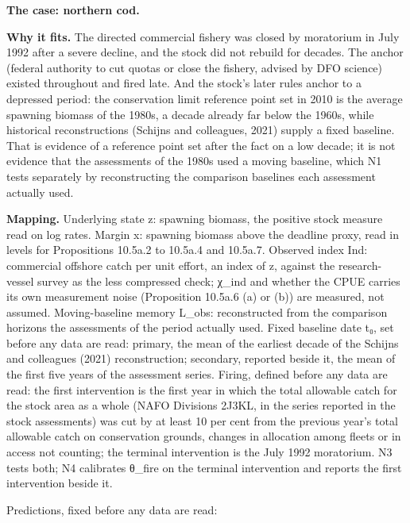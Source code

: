 \documentclass[
]{article}
\begin{document}
\textbf{The case: northern cod.}

\textbf{Why it fits.} The directed commercial fishery was closed by
moratorium in July 1992 after a severe decline, and the stock did not
rebuild for decades. The anchor (federal authority to cut quotas or
close the fishery, advised by DFO science) existed throughout and fired
late. And the stock's later rules anchor to a depressed period: the
conservation limit reference point set in 2010 is the average spawning
biomass of the 1980s, a decade already far below the 1960s, while
historical reconstructions (Schijns and colleagues, 2021) supply a fixed
baseline. That is evidence of a reference point set after the fact on a
low decade; it is not evidence that the assessments of the 1980s used a
moving baseline, which N1 tests separately by reconstructing the
comparison baselines each assessment actually used.

\textbf{Mapping.} Underlying state z: spawning biomass, the positive
stock measure read on log rates. Margin x: spawning biomass above the
deadline proxy, read in levels for Propositions 10.5a.2 to 10.5a.4 and
10.5a.7. Observed index Ind: commercial offshore catch per unit effort,
an index of z, against the research-vessel survey as the less compressed
check; χ\_ind and whether the CPUE carries its own measurement noise
(Proposition 10.5a.6 (a) or (b)) are measured, not assumed.
Moving-baseline memory L\_obs: reconstructed from the comparison
horizons the assessments of the period actually used. Fixed baseline
date t₀, set before any data are read: primary, the mean of the earliest
decade of the Schijns and colleagues (2021) reconstruction; secondary,
reported beside it, the mean of the first five years of the assessment
series. Firing, defined before any data are read: the first intervention
is the first year in which the total allowable catch for the stock area
as a whole (NAFO Divisions 2J3KL, in the series reported in the stock
assessments) was cut by at least 10 per cent from the previous year's
total allowable catch on conservation grounds, changes in allocation
among fleets or in access not counting; the terminal intervention is the
July 1992 moratorium. N3 tests both; N4 calibrates θ\_fire on the
terminal intervention and reports the first intervention beside it.

Predictions, fixed before any data are read:
\end{document}
